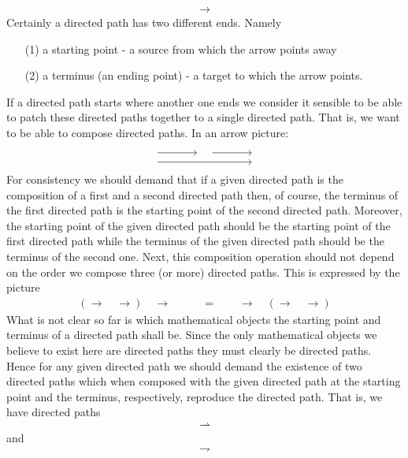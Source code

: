 \begin{align*}
  \longrightarrow
\end{align*}
Certainly a directed path has two different ends. Namely
\begin{enumerate}
\item[(1)]
a starting point - a source from which the arrow points away
\item[(2)]
a terminus (an ending point) - a target to which the arrow points.
\end{enumerate}
If a directed path starts where another one ends we consider it sensible to be able to patch these directed paths together to a single directed path. That is, we want to be able to compose directed paths. In an arrow picture:
\[
\begin{tikzcd}[sep=large]
  \phantom{1}
  \arrow[shift left=1ex]{r}{}
  \arrow[shift right=1ex]{rr}{}
  &
  \phantom{1}
  \arrow[shift left=1ex]{r}{}
  &
  \phantom{1}
\end{tikzcd}
\]
For consistency we should demand that if a given directed path is the composition of a first and a second directed path then, of course, the terminus of the first directed path is the starting point of the second directed path. Moreover, the starting point of the given directed path should be the starting point of the first directed path while the terminus of the given directed path should be the terminus of the second one. Next, this composition operation should not depend on the order we compose three (or more) directed paths. This is expressed by the picture
\begin{align*}
  \left(
    \longrightarrow
    \quad
    \longrightarrow
  \right)
  \quad
  \longrightarrow
  \qquad
  &=
  \qquad
  \longrightarrow
  \quad
  \left(
    \longrightarrow
    \quad
    \longrightarrow
  \right)
\end{align*}
What is not clear so far is which mathematical objects the starting point and terminus of a directed path shall be. Since the only mathematical objects we believe to exist here are directed paths they must clearly be directed paths. Hence for any given directed path we should demand the existence of two directed paths which when composed with the given directed path at the starting point and the terminus, respectively, reproduce the directed path. That is, we have directed paths
\begin{align*}
  \rightharpoonup
\end{align*}
and
\begin{align*}
  \rightharpoondown
\end{align*}
